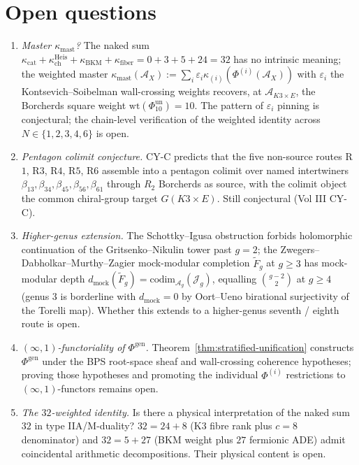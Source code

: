 \documentclass[11pt]{article}
\begin{document}
\section{Open questions}
\label{sec:open}

\begin{enumerate}
\item \emph{Master $\kappa_{\mathrm{mast}}$?} The naked sum
$\kappa_{\mathrm{cat}} + \kappa_{\mathrm{ch}}^{\mathrm{Heis}}
+ \kappa_{\mathrm{BKM}} + \kappa_{\mathrm{fiber}}
= 0 + 3 + 5 + 24 = 32$ has no intrinsic meaning; the weighted
master
$\kappa_{\mathrm{mast}}(\mathcal A_X) := \sum_i \varepsilon_i
\kappa_{(i)}(\Phi^{(i)}(\mathcal A_X))$
with $\varepsilon_i$ the Kontsevich--Soibelman wall-crossing
weights recovers, at $\mathcal A_{K3 \times E}$, the Borcherds
square weight $\mathrm{wt}(\Phi_{10}^{\mathrm{un}})=10$.
The pattern of $\varepsilon_i$ pinning is conjectural; the
chain-level verification of the weighted identity across
$N \in \{1, 2, 3, 4, 6\}$ is open.
\item \emph{Pentagon colimit conjecture.} CY-C predicts that the
five non-source routes R$1$, R$3$, R$4$, R$5$, R$6$ assemble into
a pentagon colimit over named intertwiners
$\beta_{13}, \beta_{34}, \beta_{45}, \beta_{56}, \beta_{61}$
through $R_2$ Borcherds as source, with the colimit object
the common chiral-group target $G(K3 \times E)$. Still
conjectural (Vol III CY-C).
\item \emph{Higher-genus extension.} The Schottky--Igusa
obstruction forbids holomorphic continuation of the Gritsenko--Nikulin
tower past $g = 2$; the Zwegers--Dabholkar--Murthy--Zagier
mock-modular completion $\widetilde F_g$ at $g \geq 3$
has mock-modular depth
$d_{\mathrm{mock}}(\widetilde F_g) = \mathrm{codim}_{\mathcal A_g}(\mathcal J_g)$,
equalling $\binom{g-2}{2}$ at $g \geq 4$ (genus $3$ is borderline
with $d_{\mathrm{mock}} = 0$ by Oort--Ueno birational
surjectivity of the Torelli map). Whether this extends to a
higher-genus seventh / eighth route is open.
\item \emph{$(\infty, 1)$-functoriality of $\Phi^{\mathrm{gen}}$.}
Theorem~\ref{thm:stratified-unification} constructs
$\Phi^{\mathrm{gen}}$ under the BPS root-space sheaf and
wall-crossing coherence hypotheses; proving those hypotheses and
promoting the individual $\Phi^{(i)}$ restrictions to
$(\infty, 1)$-functors remains open.
\item \emph{The $32$-weighted identity.} Is there a physical
interpretation of the naked sum $32$ in type IIA/M-duality?
$32 = 24 + 8$ (K3 fibre rank plus $c = 8$ denominator) and
$32 = 5 + 27$ (BKM weight plus $27$ fermionic ADE)
admit coincidental arithmetic decompositions. Their
physical content is open.
\end{enumerate}
\end{document}
